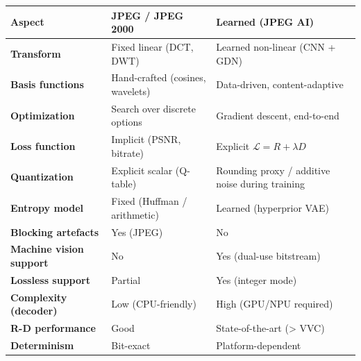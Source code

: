 \begin{center}
\begin{tabular}{|l|l|l|}
\hline
\textbf{Aspect} & \textbf{JPEG / JPEG 2000} & \textbf{Learned (JPEG AI)} \\ \hline
\textbf{Transform} & Fixed linear (DCT, DWT) & Learned non-linear (CNN + GDN) \\ \hline
\textbf{Basis functions} & Hand-crafted (cosines, wavelets) & Data-driven, content-adaptive \\ \hline
\textbf{Optimization} & Search over discrete options & Gradient descent, end-to-end \\ \hline
\textbf{Loss function} & Implicit (PSNR, bitrate) & Explicit $\mathcal{L} = R + \lambda D$ \\ \hline
\textbf{Quantization} & Explicit scalar (Q-table) & Rounding proxy / additive noise during training \\ \hline
\textbf{Entropy model} & Fixed (Huffman / arithmetic) & Learned (hyperprior VAE) \\ \hline
\textbf{Blocking artefacts} & Yes (JPEG) & No \\ \hline
\textbf{Machine vision support} & No & Yes (dual-use bitstream) \\ \hline
\textbf{Lossless support} & Partial & Yes (integer mode) \\ \hline
\textbf{Complexity (decoder)} & Low (CPU-friendly) & High (GPU/NPU required) \\ \hline
\textbf{R-D performance} & Good & State-of-the-art (\textgreater{} VVC) \\ \hline
\textbf{Determinism} & Bit-exact & Platform-dependent \\ \hline
\end{tabular}
\end{center}

